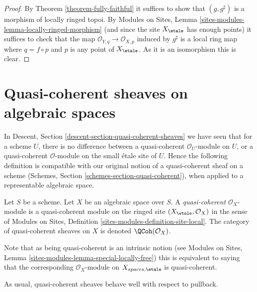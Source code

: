 \begin{proof}
By
Theorem \ref{theorem-fully-faithful}
it suffices to show that $(g, g^\sharp)$ is a morphism of
locally ringed topoi. By
Modules on Sites, Lemma \ref{sites-modules-lemma-locally-ringed-morphism}
(and since the site $X_\etale$ has enough points)
it suffices to check that the map
$\mathcal{O}_{Y, q} \to \mathcal{O}_{X, p}$ induced by $g^\sharp$
is a local ring map where $q = f \circ p$ and $p$ is any point of
$X_\etale$. As it is an isomorphism this is clear.
\end{proof}














\section{Quasi-coherent sheaves on algebraic spaces}
\label{section-quasi-coherent}

\noindent
In
Descent, Section \ref{descent-section-quasi-coherent-sheaves}
we have seen that for a scheme $U$, there is no difference between a
quasi-coherent $\mathcal{O}_U$-module on $U$, or a quasi-coherent
$\mathcal{O}$-module on the small \'etale site of $U$. Hence the following
definition is compatible with our original notion of a quasi-coherent sheaf
on a scheme
(Schemes, Section \ref{schemes-section-quasi-coherent}),
when applied to a representable algebraic space.

\begin{definition}
\label{definition-quasi-coherent}
Let $S$ be a scheme. Let $X$ be an algebraic space over $S$.
A {\it quasi-coherent} $\mathcal{O}_X$-module
is a quasi-coherent module on the ringed site
$(X_\etale, \mathcal{O}_X)$ in the sense of
Modules on Sites,
Definition \ref{sites-modules-definition-site-local}.
The category of quasi-coherent sheaves on $X$ is denoted
$\QCoh(\mathcal{O}_X)$.
\end{definition}

\noindent
Note that as being quasi-coherent is an intrinsic notion (see
Modules on Sites, Lemma \ref{sites-modules-lemma-special-locally-free})
this is equivalent to saying that the corresponding $\mathcal{O}_X$-module
on $X_{spaces, \etale}$ is quasi-coherent.

\medskip\noindent
As usual, quasi-coherent sheaves behave well with respect to pullback.

